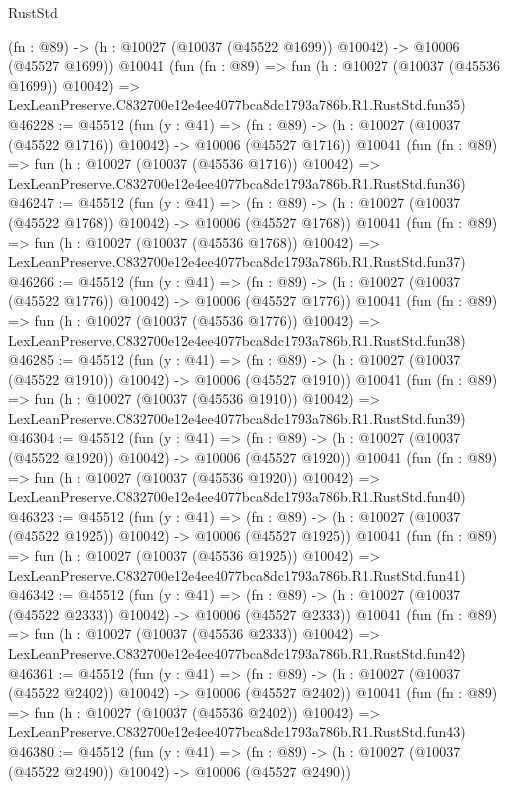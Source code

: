 \begin{lexlean}{RustStd}
\begin{coremodule}
    (fn : @89) -> (h : @10027 (@10037 (@45522 @1699)) @10042) -> @10006 (@45527 @1699))
    @10041
    (fun (fn : @89) =>
    fun (h : @10027 (@10037 (@45536 @1699)) @10042) =>
    LexLeanPreserve.C832700e12e4ee4077bca8dc1793a786b.R1.RustStd.fun35)
@46228 := @45512
    (fun (y : @41) =>
    (fn : @89) -> (h : @10027 (@10037 (@45522 @1716)) @10042) -> @10006 (@45527 @1716))
    @10041
    (fun (fn : @89) =>
    fun (h : @10027 (@10037 (@45536 @1716)) @10042) =>
    LexLeanPreserve.C832700e12e4ee4077bca8dc1793a786b.R1.RustStd.fun36)
@46247 := @45512
    (fun (y : @41) =>
    (fn : @89) -> (h : @10027 (@10037 (@45522 @1768)) @10042) -> @10006 (@45527 @1768))
    @10041
    (fun (fn : @89) =>
    fun (h : @10027 (@10037 (@45536 @1768)) @10042) =>
    LexLeanPreserve.C832700e12e4ee4077bca8dc1793a786b.R1.RustStd.fun37)
@46266 := @45512
    (fun (y : @41) =>
    (fn : @89) -> (h : @10027 (@10037 (@45522 @1776)) @10042) -> @10006 (@45527 @1776))
    @10041
    (fun (fn : @89) =>
    fun (h : @10027 (@10037 (@45536 @1776)) @10042) =>
    LexLeanPreserve.C832700e12e4ee4077bca8dc1793a786b.R1.RustStd.fun38)
@46285 := @45512
    (fun (y : @41) =>
    (fn : @89) -> (h : @10027 (@10037 (@45522 @1910)) @10042) -> @10006 (@45527 @1910))
    @10041
    (fun (fn : @89) =>
    fun (h : @10027 (@10037 (@45536 @1910)) @10042) =>
    LexLeanPreserve.C832700e12e4ee4077bca8dc1793a786b.R1.RustStd.fun39)
@46304 := @45512
    (fun (y : @41) =>
    (fn : @89) -> (h : @10027 (@10037 (@45522 @1920)) @10042) -> @10006 (@45527 @1920))
    @10041
    (fun (fn : @89) =>
    fun (h : @10027 (@10037 (@45536 @1920)) @10042) =>
    LexLeanPreserve.C832700e12e4ee4077bca8dc1793a786b.R1.RustStd.fun40)
@46323 := @45512
    (fun (y : @41) =>
    (fn : @89) -> (h : @10027 (@10037 (@45522 @1925)) @10042) -> @10006 (@45527 @1925))
    @10041
    (fun (fn : @89) =>
    fun (h : @10027 (@10037 (@45536 @1925)) @10042) =>
    LexLeanPreserve.C832700e12e4ee4077bca8dc1793a786b.R1.RustStd.fun41)
@46342 := @45512
    (fun (y : @41) =>
    (fn : @89) -> (h : @10027 (@10037 (@45522 @2333)) @10042) -> @10006 (@45527 @2333))
    @10041
    (fun (fn : @89) =>
    fun (h : @10027 (@10037 (@45536 @2333)) @10042) =>
    LexLeanPreserve.C832700e12e4ee4077bca8dc1793a786b.R1.RustStd.fun42)
@46361 := @45512
    (fun (y : @41) =>
    (fn : @89) -> (h : @10027 (@10037 (@45522 @2402)) @10042) -> @10006 (@45527 @2402))
    @10041
    (fun (fn : @89) =>
    fun (h : @10027 (@10037 (@45536 @2402)) @10042) =>
    LexLeanPreserve.C832700e12e4ee4077bca8dc1793a786b.R1.RustStd.fun43)
@46380 := @45512
    (fun (y : @41) =>
    (fn : @89) -> (h : @10027 (@10037 (@45522 @2490)) @10042) -> @10006 (@45527 @2490))

\end{coremodule}
\end{lexlean}

